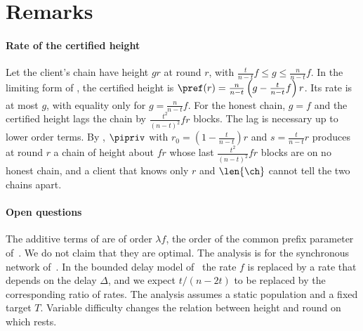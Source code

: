 \section{Remarks}
\label{sec.further}

\paragraph{Rate of the certified height}

Let the client's chain have height $gr$ at round $r$, with
$\frac{t}{n-t}f\le g\le\frac{n}{n-t}f$. In the limiting form of
, the certified height is
$\pref(r)=\frac{n}{n-t}\left(g-\frac{t}{n-t}f\right)r$. Its rate is at most
$g$, with equality only for $g=\frac{n}{n-t}f$. For the honest chain, $g=f$ and the certified height lags
the chain by $\frac{t^2}{(n-t)^2}fr$ blocks. The lag is necessary up to lower
order terms. By , $\pipriv$ with $r_0=(1-\frac{t}{n-t})r$
and $s=\frac{t}{n-t}r$ produces at round $r$ a chain of height about $fr$
whose last $\frac{t^2}{(n-t)^2}fr$ blocks are on no honest chain, and a
client that knows only $r$ and $\len{\ch}$ cannot tell the two chains apart.

\paragraph{Open questions}

The additive terms of  are of order $\lambda f$,
the order of the common prefix parameter of~\cite{gkl24}. We do not claim
that they are optimal. The analysis is for the synchronous network
of~\cite{gkl24}. In the bounded delay model of~\cite{gkl24,pss16} the rate
$f$ is replaced by a rate that depends on the delay $\Delta$, and we expect
$t/(n-2t)$ to be replaced by the corresponding ratio of rates. The analysis
assumes a static population and a fixed target $T$. Variable difficulty
changes the relation between height and round on which 
rests.
